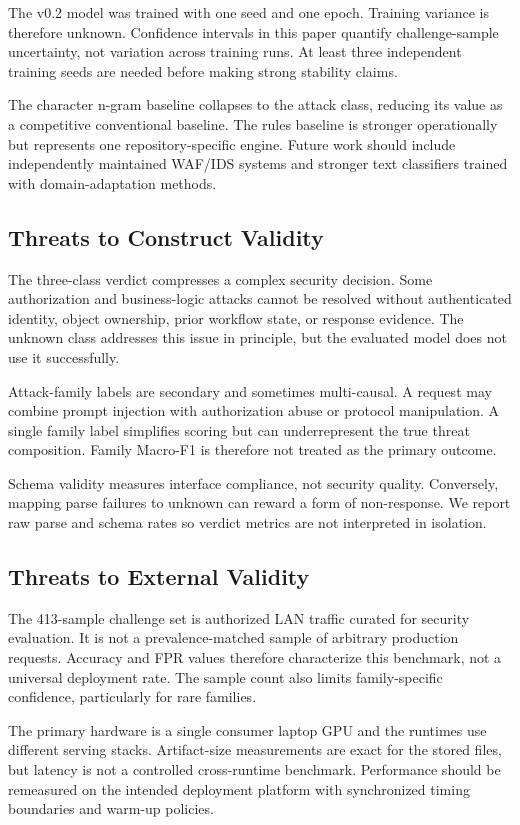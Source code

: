 The v0.2 model was trained with one seed and one epoch. Training variance is therefore unknown. Confidence intervals in this paper quantify challenge-sample uncertainty, not variation across training runs. At least three independent training seeds are needed before making strong stability claims.

The character n-gram baseline collapses to the attack class, reducing its value as a competitive conventional baseline. The rules baseline is stronger operationally but represents one repository-specific engine. Future work should include independently maintained WAF/IDS systems and stronger text classifiers trained with domain-adaptation methods.

\subsection{Threats to Construct Validity}
The three-class verdict compresses a complex security decision. Some authorization and business-logic attacks cannot be resolved without authenticated identity, object ownership, prior workflow state, or response evidence. The unknown class addresses this issue in principle, but the evaluated model does not use it successfully.

Attack-family labels are secondary and sometimes multi-causal. A request may combine prompt injection with authorization abuse or protocol manipulation. A single family label simplifies scoring but can underrepresent the true threat composition. Family Macro-F1 is therefore not treated as the primary outcome.

Schema validity measures interface compliance, not security quality. Conversely, mapping parse failures to unknown can reward a form of non-response. We report raw parse and schema rates so verdict metrics are not interpreted in isolation.

\subsection{Threats to External Validity}
The 413-sample challenge set is authorized LAN traffic curated for security evaluation. It is not a prevalence-matched sample of arbitrary production requests. Accuracy and FPR values therefore characterize this benchmark, not a universal deployment rate. The sample count also limits family-specific confidence, particularly for rare families.

The primary hardware is a single consumer laptop GPU and the runtimes use different serving stacks. Artifact-size measurements are exact for the stored files, but latency is not a controlled cross-runtime benchmark. Performance should be remeasured on the intended deployment platform with synchronized timing boundaries and warm-up policies.

